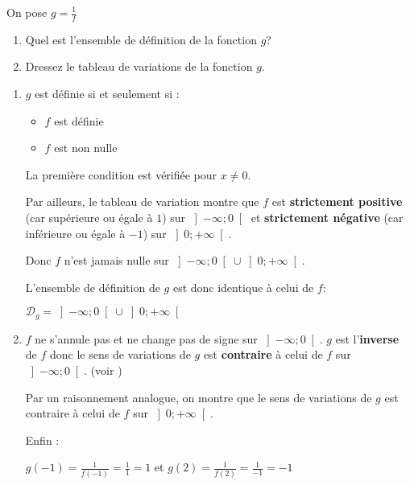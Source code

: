 \par
On pose $g=\frac{1}{f}$
\begin{enumerate}
     \item
     Quel est l'ensemble de définition de la fonction $g$?
     \item
     Dressez le tableau de variations de la fonction $g$.
\end{enumerate}
\begin{corrige}
     \begin{enumerate}
          \item
          $g$ est définie si et seulement si :
          \begin{itemize}
               \item
               $f $ est définie
               \item
               $ f $ est non nulle
          \end{itemize}
          La première condition est vérifiée pour $x\neq 0$.
          \par
          Par ailleurs, le tableau de variation montre que $f$ est \textbf{strictement positive} (car supérieure ou égale à $1$) sur $\left]-\infty  ; 0\right[$ et \textbf{strictement négative} (car inférieure ou égale à $-1$) sur $\left]0 ; +\infty \right[$.
          \par
          Donc $f$ n'est jamais nulle sur $\left]-\infty  ; 0\right[ \cup  \left]0 ; +\infty \right[$.
          \par
          L'ensemble de définition de $g$ est donc identique à celui de $f$:
          \begin{center}$\mathscr D_{g}=\left]-\infty  ; 0\right[ \cup  \left]0 ; +\infty \right[$\end{center}
          \item
          $f$ ne s'annule pas et ne change pas de signe sur $\left]-\infty  ; 0\right[$. $g$ est l'\textbf{inverse} de $f$ donc le sens de variations de $g$ est  \textbf{contraire} à celui de $f$ sur $\left]-\infty  ; 0\right[$. (voir )
          \par
          Par un raisonnement analogue, on montre que le sens de variations de $g$ est  contraire à celui de $f$ sur $\left]0 ; +\infty \right[$.
          \par
          Enfin :
          \par
          $g\left(-1\right)=\frac{1}{f\left(-1\right)}=\frac{1}{1}=1$ et $g\left(2\right)=\frac{1}{f\left(2\right)}=\frac{1}{-1}=-1$

\end{enumerate}
\end{corrige}
